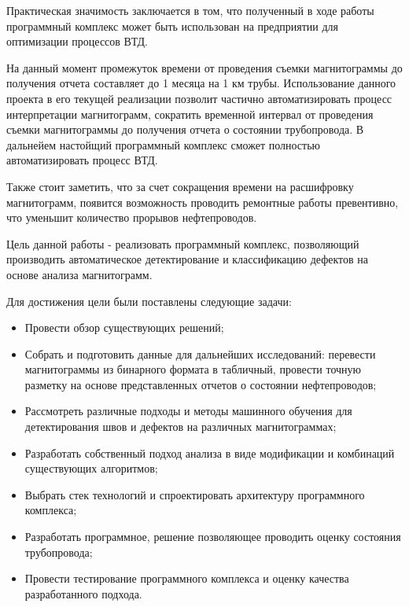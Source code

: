 \documentclass[a4paper,article,14pt]{extarticle}
\begin{document}
Практическая значимость заключается в том, что полученный в ходе работы программный комплекс может быть 
использован на предприятии для оптимизации процессов ВТД. 

На данный момент промежуток времени от проведения съемки магнитограммы до получения отчета составляет 
до 1 месяца на 1 км трубы. Использование данного проекта в его текущей реализации позволит частично 
автоматизировать процесс интерпретации магнитограмм, сократить временной интервал от проведения 
съемки магнитограммы до получения отчета о состоянии трубопровода. 
В дальнейем настойщий программный комплекс сможет полностью автоматизировать процесс ВТД.

Также стоит заметить, что за счет сокращения времени на расшифровку магнитограмм, появится возможность 
проводить ремонтные работы превентивно, что уменьшит количество прорывов нефтепроводов.


\pagebreak
{}

Цель данной работы - реализовать программный комплекс, позволяющий производить автоматическое детектирование и классификацию дефектов на основе анализа магнитограмм. 

\pagebreak
{}

Для достижения цели были поставлены следующие задачи:

\begin{itemize}
    \item Провести обзор существующих решений;
    \item Собрать и подготовить данные для дальнейших исследований: перевести магнитограммы из бинарного формата в табличный, 
    провести точную разметку на основе представленных отчетов о состоянии нефтепроводов;
    \item Рассмотреть различные подходы и методы машинного обучения для детектирования швов и дефектов на различных магнитограммах;
    \item Разработать собственный подход анализа в виде модификации и комбинаций существующих алгоритмов;
    \item Выбрать стек технологий и спроектировать архитектуру программного комплекса;
    \item Разработать программное, решение позволяющее проводить оценку состояния трубопровода;
    \item Провести тестирование программного комплекса и оценку качества разработанного подхода.
\end{itemize}
\end{document}
